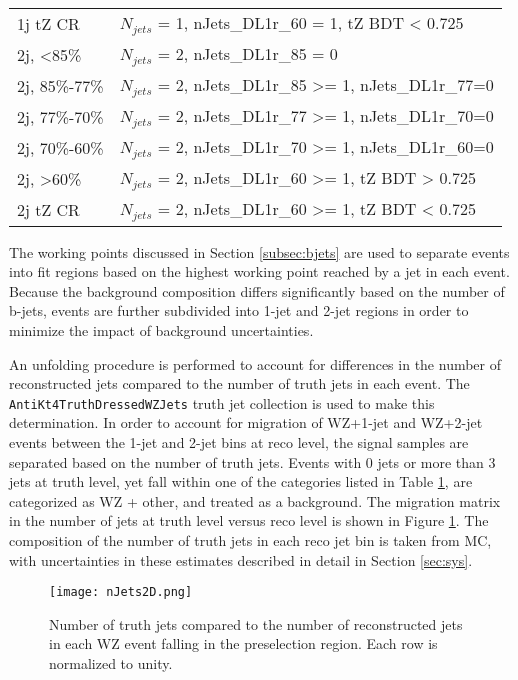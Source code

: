 \begin{table}[H]
\begin{tabular}{l|l}
1j tZ CR        & $N_{jets}$ = 1, nJets\_DL1r\_60 = 1, tZ BDT < 0.725 \\
2j, <85\%       & $N_{jets}$ = 2, nJets\_DL1r\_85 = 0                    \\
2j, 85\%-77\%   & $N_{jets}$ = 2, nJets\_DL1r\_85 >= 1, nJets\_DL1r\_77=0                     \\
2j, 77\%-70\%   & $N_{jets}$ = 2, nJets\_DL1r\_77 >= 1, nJets\_DL1r\_70=0                     \\
2j, 70\%-60\%   & $N_{jets}$ = 2, nJets\_DL1r\_70 >= 1, nJets\_DL1r\_60=0                      \\
2j, >60\%       & $N_{jets}$ = 2, nJets\_DL1r\_60 >= 1, tZ BDT > 0.725 \\
2j tZ CR        & $N_{jets}$ = 2, nJets\_DL1r\_60 >= 1, tZ BDT < 0.725 \\
\hline\hline
\end{tabular}
\label{tab:regions}
\end{table}

The working points discussed in Section \ref{subsec:bjets} are used to separate events into fit regions based on the highest working point reached by a jet in each event. Because the background composition differs significantly based on the number of b-jets, events are further subdivided into 1-jet and 2-jet regions in order to minimize the impact of background uncertainties.

An unfolding procedure is performed to account for differences in the number of reconstructed jets compared to the number of truth jets in each event. The \verb!AntiKt4TruthDressedWZJets! truth jet collection is used to make this determination. In order to account for migration of WZ+1-jet and WZ+2-jet events between the 1-jet and 2-jet bins at reco level, the signal samples are separated based on the number of truth jets. Events with 0 jets or more than 3 jets at truth level, yet fall within one of the categories listed in Table \ref{tab:regions}, are categorized as WZ + other, and treated as a background. The migration matrix in the number of jets at truth level versus reco level is shown in Figure \ref{fig:migrationMat}. The composition of the number of truth jets in each reco jet bin is taken from MC, with uncertainties in these estimates described in detail in Section \ref{sec:sys}. 

\begin{figure}[H]
\center
\texttt{[image: nJets2D.png]}
\caption{Number of truth jets compared to the number of reconstructed jets in each WZ event falling in the preselection region. Each row is normalized to unity.} 
\label{fig:migrationMat}
\end{figure}

